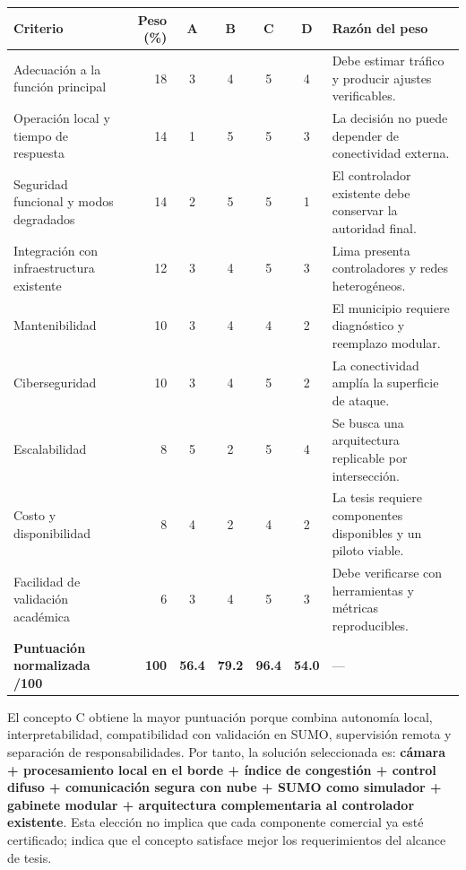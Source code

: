 \documentclass[12pt,a4paper,oneside]{report}
\begin{document}
\begin{landscape}
\footnotesize
{}
\label{tbl:evaluacion-conceptos-v2}
\begin{longtable}{@{}p{5.0cm}rccccp{5.0cm}@{}}
\toprule
\textbf{Criterio} & \textbf{Peso (\%)} & \textbf{A} & \textbf{B} & \textbf{C} & \textbf{D} & \textbf{Razón del peso}\\
\midrule
\endhead
Adecuación a la función principal & 18 & 3 & 4 & 5 & 4 & Debe estimar tráfico y producir ajustes verificables.\\
Operación local y tiempo de respuesta & 14 & 1 & 5 & 5 & 3 & La decisión no puede depender de conectividad externa.\\
Seguridad funcional y modos degradados & 14 & 2 & 5 & 5 & 1 & El controlador existente debe conservar la autoridad final.\\
Integración con infraestructura existente & 12 & 3 & 4 & 5 & 3 & Lima presenta controladores y redes heterogéneos.\\
Mantenibilidad & 10 & 3 & 4 & 4 & 2 & El municipio requiere diagnóstico y reemplazo modular.\\
Ciberseguridad & 10 & 3 & 4 & 5 & 2 & La conectividad amplía la superficie de ataque.\\
Escalabilidad & 8 & 5 & 2 & 5 & 4 & Se busca una arquitectura replicable por intersección.\\
Costo y disponibilidad & 8 & 4 & 2 & 4 & 2 & La tesis requiere componentes disponibles y un piloto viable.\\
Facilidad de validación académica & 6 & 3 & 4 & 5 & 3 & Debe verificarse con herramientas y métricas reproducibles.\\
\midrule
\textbf{Puntuación normalizada /100} & \textbf{100} & \textbf{56.4} & \textbf{79.2} & \textbf{96.4} & \textbf{54.0} & ---\\
\bottomrule
\end{longtable}
\end{landscape}

El concepto C obtiene la mayor puntuación porque combina autonomía local, interpretabilidad, compatibilidad con validación en SUMO, supervisión remota y separación de responsabilidades. Por tanto, la solución seleccionada es: \textbf{cámara + procesamiento local en el borde + índice de congestión + control difuso + comunicación segura con nube + SUMO como simulador + gabinete modular + arquitectura complementaria al controlador existente}. Esta elección no implica que cada componente comercial ya esté certificado; indica que el concepto satisface mejor los requerimientos del alcance de tesis.
\end{document}

